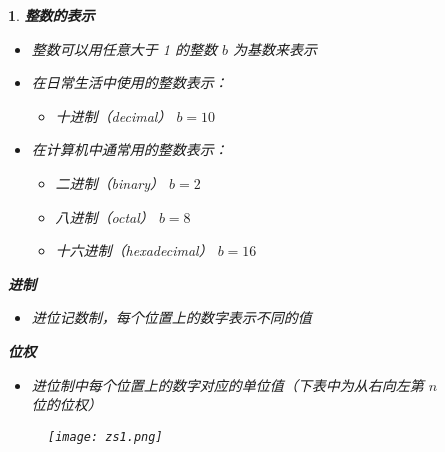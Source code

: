 \documentclass[UTF8]{report}
\theoremstyle{MyLineTheoremStyle} %
\theoremstyle{MyBlockTheoremStyle} %
\theoremstyle{MySubsubsectionStyle} %
\newtheorem{definition}{}
\begin{document}
\begin{definition}
    \textbf{整数的表示}
    \begin{itemize}
        \item 整数可以用任意大于 1 的整数 $b$ 为基数来表示
        \item 在日常生活中使用的整数表示：
        \begin{itemize}
            \item 十进制（decimal） $b = 10$
        \end{itemize}
        \item 在计算机中通常用的整数表示：
        \begin{itemize}
            \item 二进制（binary） $b = 2$
            \item 八进制（octal） $b = 8$
            \item 十六进制（hexadecimal） $b = 16$
        \end{itemize}
    \end{itemize}

    \textbf{进制}
    \begin{itemize}
        \item 进位记数制，每个位置上的数字表示不同的值
    \end{itemize}

    \textbf{位权}
    \begin{itemize}
        \item 进位制中每个位置上的数字对应的单位值（下表中为从右向左第 $n$ 位的位权）
    \end{itemize}

    \begin{figure}[ht]
        \centering
        \texttt{[image: zs1.png]}
    \end{figure}
\end{definition}
\end{document}
